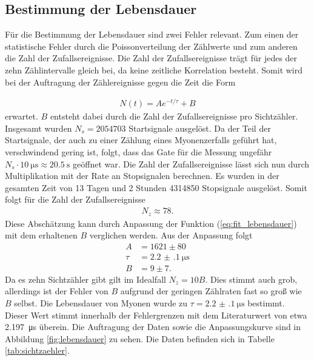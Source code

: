 \subsection{Bestimmung der Lebensdauer}
Für die Bestimmung der Lebensdauer sind zwei Fehler relevant. Zum einen der statistische Fehler durch die Poissonverteilung der Zählwerte und zum anderen die Zahl der Zufallsereignisse. Die Zahl der Zufallsereignisse trägt für jedes der zehn Zählintervalle gleich bei, da keine zeitliche Korrelation besteht. Somit wird bei der Auftragung der Zählereignisse gegen die Zeit die Form

\begin{align}
  N(t)=A e^{-t/\tau}+B
  \label{eq:fit_lebensdauer}
\end{align}
 erwartet. $B$ entsteht dabei durch die Zahl der Zufallsereignisse pro Sichtzähler.
Insgesamt wurden $N_s=2054703$ Startsignale ausgelöst. Da der Teil der Startsignale, der auch zu einer Zählung eines Myonenzerfalls geführt hat, verschwindend gering ist, folgt, dass das Gate für die Messung ungefähr $N_s \cdot \SI{10}{\micro\second}\approx\SI{20.5}{\second}$ geöffnet war. Die Zahl der Zufallsereignisse lässt sich nun durch Multiplikation mit der Rate an Stopsignalen berechnen. Es wurden in der gesamten Zeit von 13 Tagen und 2 Stunden 4314850 Stopsignale ausgelöst. Somit folgt für die Zahl der Zufallsereignisse 
\begin{align*}
  N_z\approx 78.
\end{align*}
Diese Abschätzung kann durch Anpassung der Funktion (\ref{eq:fit_lebensdauer}) mit dem erhaltenen $B$ verglichen werden. Aus der Anpassung folgt
\begin{align*}
  A&=1621 \pm 80\\
  \tau&=\SI[separate-uncertainty = true]{2.2(1)}{\micro\second}\\
  B&=9 \pm 7.
\end{align*}
Da es zehn Sichtzähler gibt gilt im Idealfall $N_z=10B$. Dies stimmt auch grob, allerdings ist der Fehler von $B$ aufgrund der geringen Zählraten fast so groß wie $B$ selbst. Die Lebensdauer von Myonen wurde zu $\tau = \SI[separate-uncertainty = true]{2.2(1)}{\micro\second}$ bestimmt. Dieser Wert stimmt innerhalb der Fehlergrenzen mit dem Literaturwert von etwa \SI{2.197}{\micro\second}\cite{pdg} überein. Die Auftragung der Daten sowie die Anpassungskurve sind in Abbildung \ref{fig:lebensdauer} zu sehen. Die Daten befinden sich in Tabelle \ref{tab:sichtzaehler}.


